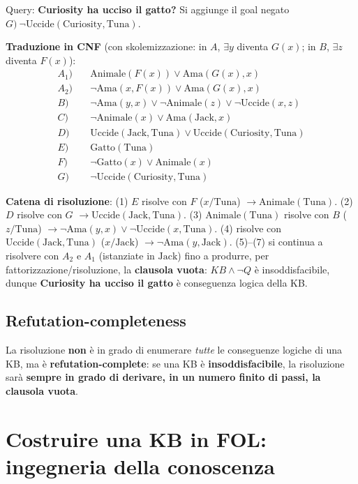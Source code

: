 \documentclass[11pt,a4paper]{report}
\begin{document}
Query: \textbf{Curiosity ha ucciso il gatto?} Si aggiunge il goal negato $G)\ \neg\text{Uccide}(\text{Curiosity},\text{Tuna})$.

\textbf{Traduzione in CNF} (con skolemizzazione: in $A$, $\exists y$ diventa $G(x)$; in $B$, $\exists z$ diventa $F(x)$):
\begin{align*}
A_1) &\quad \text{Animale}(F(x)) \vee \text{Ama}(G(x),x) \\
A_2) &\quad \neg\text{Ama}(x,F(x)) \vee \text{Ama}(G(x),x) \\
B) &\quad \neg\text{Ama}(y,x) \vee \neg\text{Animale}(z) \vee \neg\text{Uccide}(x,z) \\
C) &\quad \neg\text{Animale}(x) \vee \text{Ama}(\text{Jack},x) \\
D) &\quad \text{Uccide}(\text{Jack},\text{Tuna}) \vee \text{Uccide}(\text{Curiosity},\text{Tuna}) \\
E) &\quad \text{Gatto}(\text{Tuna}) \\
F) &\quad \neg\text{Gatto}(x) \vee \text{Animale}(x) \\
G) &\quad \neg\text{Uccide}(\text{Curiosity},\text{Tuna})
\end{align*}

\textbf{Catena di risoluzione}: (1) $E$ risolve con $F$ ($x/\text{Tuna}$) $\to \text{Animale}(\text{Tuna})$. (2) $D$ risolve con $G$ $\to \text{Uccide}(\text{Jack},\text{Tuna})$. (3) $\text{Animale}(\text{Tuna})$ risolve con $B$ ($z/\text{Tuna}$) $\to \neg\text{Ama}(y,x)\vee\neg\text{Uccide}(x,\text{Tuna})$. (4) risolve con $\text{Uccide}(\text{Jack},\text{Tuna})$ ($x/\text{Jack}$) $\to \neg\text{Ama}(y,\text{Jack})$. (5)--(7) si continua a risolvere con $A_2$ e $A_1$ (istanziate in $\text{Jack}$) fino a produrre, per fattorizzazione/risoluzione, la \textbf{clausola vuota}: $KB\wedge\neg Q$ è insoddisfacibile, dunque \textbf{Curiosity ha ucciso il gatto} è conseguenza logica della KB.

\subsection*{Refutation-completeness}

La risoluzione \textbf{non} è in grado di enumerare \emph{tutte} le conseguenze logiche di una KB, ma è \textbf{refutation-complete}: se una KB è \textbf{insoddisfacibile}, la risoluzione sarà \textbf{sempre in grado di derivare, in un numero finito di passi, la clausola vuota}.

\section{Costruire una KB in FOL: ingegneria della conoscenza}
\end{document}
